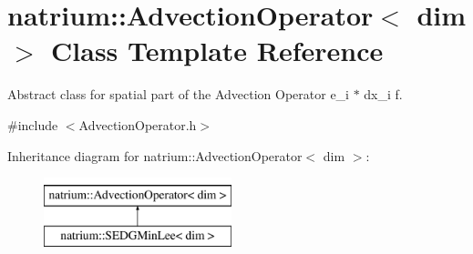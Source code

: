 \hypertarget{classnatrium_1_1AdvectionOperator}{\section{natrium\-:\-:Advection\-Operator$<$ dim $>$ Class Template Reference}
\label{classnatrium_1_1AdvectionOperator}
}


Abstract class for spatial part of the Advection Operator e\-\_\-i $\ast$ dx\-\_\-i f.  




{\ttfamily \#include $<$Advection\-Operator.\-h$>$}

Inheritance diagram for natrium\-:\-:Advection\-Operator$<$ dim $>$\-:\begin{figure}[H]
\begin{center}
\leavevmode
\includegraphics[height=2.000000cm]{classnatrium_1_1AdvectionOperator}
\end{center}
\end{figure}
